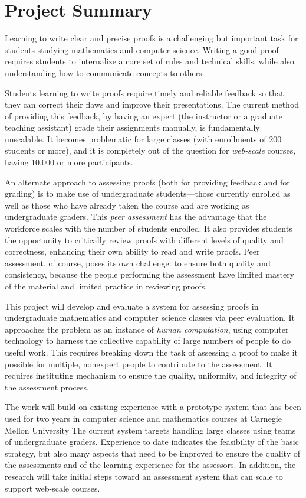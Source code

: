 \documentclass[12pt]{article}
\begin{document}
\section*{Project Summary}

Learning to write clear and precise proofs is a challenging but
important task for students studying mathematics and computer science.
Writing a good proof requires students to internalize a core set of
rules and technical skills, while also understanding how to
communicate concepts to others.

Students learning to write proofs require timely and reliable feedback
so that they can correct their flaws and improve their
presentations.  The current method of providing this feedback, by
having an expert (the instructor or a graduate teaching assistant)
grade their assignments manually, is fundamentally unscalable.  It becomes
problematic for large classes (with enrollments of 200 students or
more), and it is completely out of the question for {\em web-scale}
courses, having 10,000 or more participants.

An alternate approach to assessing proofs (both for providing feedback
and for grading) is to make use of undergraduate students---those
currently enrolled as well as those who have already taken the course
and are working as undergraduate graders.  This {\em peer assessment}
has the advantage that the workforce scales with the number of
students enrolled.  It also provides students the opportunity to
critically review proofs with different levels of quality and
correctness, enhancing their own ability to read and write proofs.
Peer assessment, of course, poses its own challenge: to ensure both
quality and consistency, because the people performing the assessment
have limited mastery of the material and limited practice in
reviewing proofs.

This project will develop and evaluate a system for assessing proofs
in undergraduate mathematics and computer science classes via peer
evaluation.  It approaches the problem as an instance of {\em human
  computation}, using computer technology to harness the collective
capability of large numbers of people to do useful work.  This
requires breaking down the task of assessing a proof to make it
possible for multiple, nonexpert people to contribute to the
assessment.  It requires instituting mechanism to ensure the quality,
uniformity, and integrity of the assessment process.

The work will build on existing experience with a prototype system
that has been used for two years in computer science and
mathematics courses at Carnegie Mellon University The current system
targets handling large classes using teams of undergraduate graders.
Experience to date indicates the feasibility of the basic
strategy, but also many aspects that need to be improved to ensure the
quality of the assessments and of the learning experience for the
assessors.  In addition, the research will take initial steps toward an
assessment system that can scale to support web-scale courses.
\end{document}
